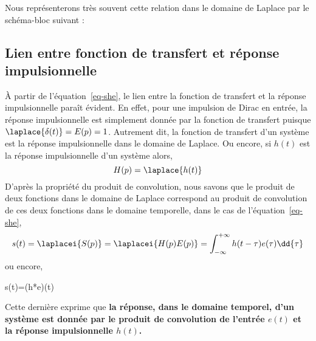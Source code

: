 Nous représenterons très souvent cette relation dans le domaine de Laplace 
par le schéma-bloc suivant : 
\begin{center}
    
\end{center}
\subsection{Lien entre fonction de transfert et réponse impulsionnelle}
À partir de l'équation~\ref{eq-she}, le lien entre la fonction de transfert
et la réponse impulsionnelle paraît évident. En effet, pour une impulsion 
de Dirac en entrée, la réponse impulsionnelle est simplement donnée par 
la fonction de transfert puisque $\laplace{\delta(t)}=E(p)=1$. 
Autrement dit, la fonction de transfert d'un système est la 
réponse impulsionnelle dans le domaine de Laplace. Ou encore, si $h(t)$ 
est la réponse impulsionnelle d'un système alors,
\[
    H(p) = \laplace{h(t)}
\]
D'après la propriété du produit de convolution, nous savons que 
le produit de deux fonctions dans le domaine de Laplace correspond au 
produit de convolution de ces deux fonctions dans le domaine temporelle, 
dans le cas de l'équation~\ref{eq-she},
\[
    s(t)=\laplacei{S(p)}=\laplacei{H(p)E(p)}
    =\int_{-\infty}^{+\infty}h(t-\tau)e(\tau)\dd{\tau}
\]
ou encore,
\begin{bequation}
    s(t)=(h*e)(t)
\end{bequation}
Cette dernière exprime que \textbf{la réponse, dans le domaine temporel, 
d'un système est donnée par le 
produit de convolution de l'entrée $e(t)$ et la réponse impulsionnelle $h(t)$.}

